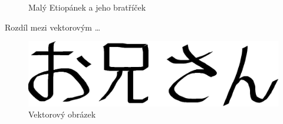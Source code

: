 \documentclass[11pt,a4paper]{article}
\begin{document}
\begin{figure}[h]
    \caption{Malý Etiopánek a jeho bratříček}
    \label{fig:etiopan}
\end{figure}
\pagebreak

Rozdíl mezi vektorovým \dots
\begin{figure}[h]
    \centering
    \includegraphics[scale=0.4]{oniisan.eps}
    \caption{Vektorový obrázek}
    \label{fig:vector}
\end{figure}
\end{document}
